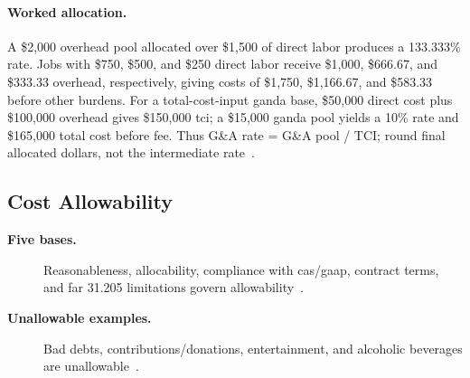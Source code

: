 \documentclass[../main.tex]{subfiles}
\begin{document}

\paragraph{Worked allocation.} A \$2,000 overhead pool allocated over \$1,500 of direct labor produces a 133.333\% rate. Jobs with \$750, \$500, and \$250 direct labor receive \$1,000, \$666.67, and \$333.33 overhead, respectively, giving costs of \$1,750, \$1,166.67, and \$583.33 before other burdens. For a total-cost-input \ac{ganda} base, \$50,000 direct cost plus \$100,000 overhead gives \$150,000 \ac{tci}; a \$15,000 \ac{ganda} pool yields a 10\% rate and \$165,000 total cost before fee. Thus G\&A rate = G\&A pool / TCI; round final allocated dollars, not the intermediate rate~\autocite{edo-3-2-4-cost-price-evaluation-2025}.

\subsection{Cost Allowability}
\begin{description}
  \item[\textbf{Five bases.}] Reasonableness, allocability, compliance with \ac{cas}/\ac{gaap}, contract terms, and \ac{far} 31.205 limitations govern allowability~\autocite{edo-3-2-4-cost-price-evaluation-2025,FAR-31-201-2-Allowability,FAR-31-201-3-Reasonableness,FAR-31-201-4-Allocability,FAR-31-205-Selected-Costs}.
  \item[\textbf{Unallowable examples.}] Bad debts, contributions/donations, entertainment, and alcoholic beverages are unallowable~\autocite{edo-3-2-4-cost-price-evaluation-2025,FAR-31-205-3-Bad-Debts,FAR-31-205-8-Contributions,FAR-31-205-14-Entertainment,FAR-31-205-51-Alcoholic-Beverages}.
\end{description}

\end{document}
